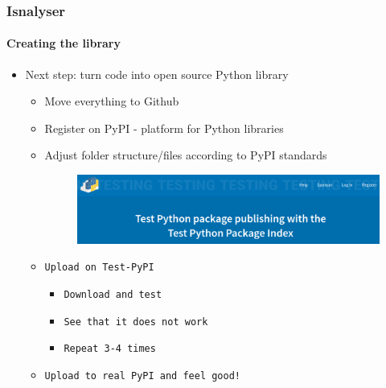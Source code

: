 \documentclass[9pt]{beamer}
\begin{document}
\begin{frame}
\frametitle{Isnalyser}
\framesubtitle{Creating the library}
\begin{itemize}%
		\item Next step: turn code into open source Python library
		\pause
		\begin{itemize}		
	\item Move everything to Github%
	\item Register on PyPI - platform for Python libraries
	\item Adjust folder structure/files according to PyPI standards
	\pause
			\begin{figure}
		\flushleft
		\includegraphics[width=.6\linewidth]{figures/test_pypi.png}
	\end{figure}
	\item \texttt{Upload on Test-PyPI}
	\begin{itemize}
		\item \texttt{Download and test}
		\item \texttt{See that it does not work}
		\item \texttt{Repeat 3-4 times}
	\end{itemize}
\pause
	\item \texttt{Upload to real PyPI and feel good!}
\end{itemize}
		\end{itemize}
\end{frame} 
\end{document}
